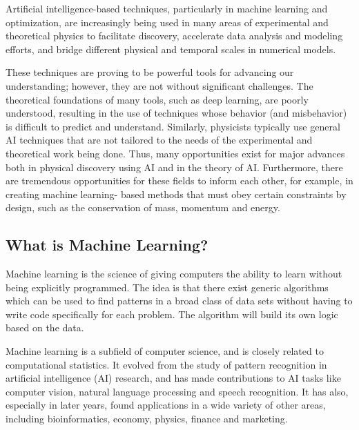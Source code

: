 \documentclass[%
oneside,                 %
final,                   %
10pt]{article}
\newenvironment{block_mdfboxadmon}[1][]{
\begin{block_mdfboxmdframed}[frametitle=#1]
}
{
\end{block_mdfboxmdframed}
}
\begin{document}
\begin{block_mdfboxadmon}[]

Artificial intelligence-based techniques, particularly in machine
learning and optimization, are increasingly being used in many areas
of experimental and theoretical physics to facilitate discovery,
accelerate data analysis and modeling efforts, and bridge different
physical and temporal scales in numerical models.

These techniques are proving to be powerful tools for advancing our
understanding; however, they are not without significant
challenges. The theoretical foundations of many tools, such as deep
learning, are poorly understood, resulting in the use of techniques
whose behavior (and misbehavior) is difficult to predict and
understand. Similarly, physicists typically use general AI techniques
that are not tailored to the needs of the experimental and theoretical
work being done. Thus, many opportunities exist for major advances
both in physical discovery using AI and in the theory of
AI. Furthermore, there are tremendous opportunities for these fields
to inform each other, for example, in creating machine learning- based
methods that must obey certain constraints by design, such as the
conservation of mass, momentum and energy.
\end{block_mdfboxadmon} %





\subsection{What is Machine Learning?}

\begin{block_mdfboxadmon}[]
Machine learning is the science of giving computers the ability to
learn without being explicitly programmed.  The idea is that there
exist generic algorithms which can be used to find patterns in a broad
class of data sets without having to write code specifically for each
problem. The algorithm will build its own logic based on the data.

Machine learning is a subfield of computer science, and is closely
related to computational statistics.  It evolved from the study of
pattern recognition in artificial intelligence (AI) research, and has
made contributions to AI tasks like computer vision, natural language
processing and speech recognition. It has also, especially in later
years, found applications in a wide variety of other areas, including
bioinformatics, economy, physics, finance and marketing.
\end{block_mdfboxadmon} %
\end{document}
